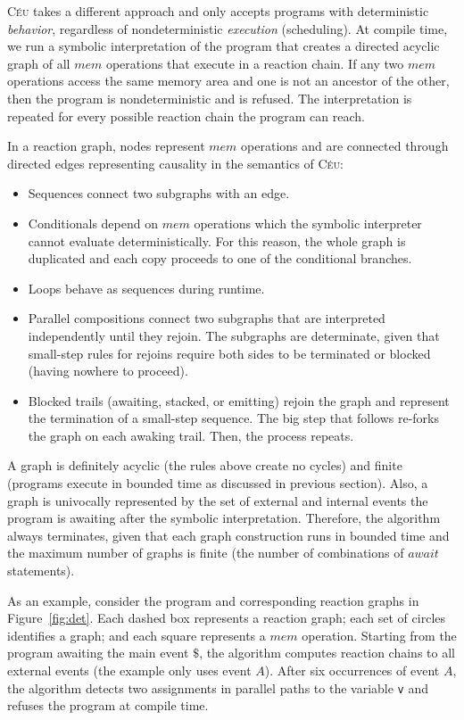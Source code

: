 \documentclass[preprint]{sigplanconf}
\newcommand{\CEU}{\textsc{C\'{e}u}\xspace}
\newcommand{\code}[1] {{\small{\texttt{#1}}}}
\newcommand{\1}{\;}
\newcommand{\2}{\;\;}
\newcommand{\3}{\;\;\;}
\newcommand{\5}{\;\;\;\;\;}
\begin{document}
\CEU takes a different approach and only accepts programs with deterministic 
\emph{behavior}, regardless of nondeterministic \emph{execution} (scheduling).
At compile time, we run a symbolic interpretation of the program that creates a 
directed acyclic graph of all $mem$ operations that execute in a reaction 
chain.
If any two $mem$ operations access the same memory area and one is not an 
ancestor of the other, then the program is nondeterministic and is refused.
The interpretation is repeated for every possible reaction chain the program 
can reach.

In a reaction graph, nodes represent $mem$ operations and are connected through 
directed edges representing causality in the semantics of \CEU:

\begin{itemize}
\item Sequences connect two subgraphs with an edge.
\item Conditionals depend on $mem$ operations which the symbolic interpreter 
cannot evaluate deterministically.
For this reason, the whole graph is duplicated and each copy proceeds to one of 
the conditional branches.
\item Loops behave as sequences during runtime.
\item Parallel compositions connect two subgraphs that are interpreted 
independently until they rejoin.
The subgraphs are determinate, given that small-step rules for rejoins require 
both sides to be terminated or blocked (having nowhere to proceed).
\item Blocked trails (awaiting, stacked, or emitting) rejoin the graph and 
represent the termination of a small-step sequence.
The big step that follows re-forks the graph on each awaking trail.
Then, the process repeats.
\end{itemize}

A graph is definitely acyclic (the rules above create no cycles) and finite 
(programs execute in bounded time as discussed in previous section).
Also, a graph is univocally represented by the set of external and internal 
events the program is awaiting after the symbolic interpretation.
Therefore, the algorithm always terminates, given that each graph construction 
runs in bounded time and the maximum number of graphs is finite (the number of 
combinations of $await$ statements).

As an example, consider the program and corresponding reaction graphs in 
Figure~\ref{fig:det}.
Each dashed box represents a reaction graph; each set of circles identifies a 
graph; and each square represents a $mem$ operation.
Starting from the program awaiting the main event $\$$, the algorithm computes 
reaction chains to all external events (the example only uses event $A$).
After six occurrences of event $A$, the algorithm detects two assignments in 
parallel paths to the variable \code{v} and refuses the program at compile 
time.
\end{document}
